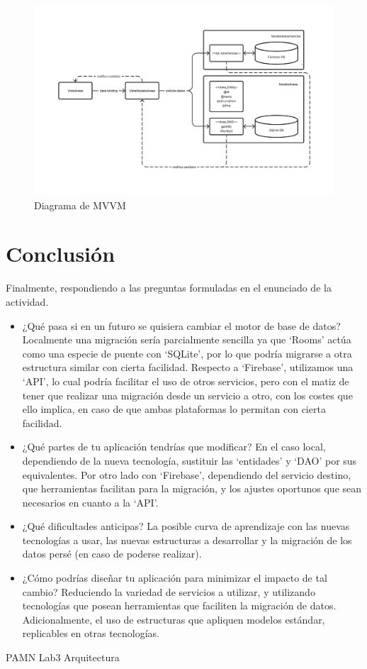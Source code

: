 \documentclass{article}
\begin{document}
    \begin{figure}[H]
        \centerline{\includegraphics[scale=0.3]{bbdddiagram}}
        \caption{Diagrama de MVVM}
        \label{fig:bbdddiagram}
    \end{figure}

    \section{Conclusión}
    Finalmente, respondiendo a las preguntas formuladas en el enunciado de la actividad.
    
    \begin{itemize}
        \item ¿Qué pasa si en un futuro se quisiera cambiar el motor de base de datos?
        Localmente una migración sería parcialmente sencilla ya que \enquote*{Rooms}
         actúa como una especie de puente con \enquote*{SQLite}, por lo que podría migrarse
         a otra estructura similar con cierta facilidad. Respecto a \enquote*{Firebase}, utilizamos
         una \enquote*{API}, lo cual podría facilitar el uso de otros servicios, pero con el matiz
         de tener que realizar una migración desde un servicio a otro, con los costes que ello
         implica, en caso de que ambas plataformas lo permitan con cierta facilidad.
        \item ¿Qué partes de tu aplicación tendrías que modificar?
        En el caso local, dependiendo de la nueva tecnología, sustituir las \enquote*{entidades} y
         \enquote*{DAO} por sus equivalentes. Por otro lado con \enquote*{Firebase}, dependiendo
         del servicio destino, que herramientas facilitan para la migración, y los ajustes
         oportunos que sean necesarios en cuanto a la \enquote*{API}.
        \item ¿Qué dificultades anticipas?
        La posible curva de aprendizaje con las nuevas tecnologías a usar, las nuevas estructuras a
         desarrollar y la migración de los datos persé (en caso de poderse realizar).
        \item ¿Cómo podrías diseñar tu aplicación para minimizar el impacto de tal cambio?
        Reduciendo la variedad de servicios a utilizar, y utilizando tecnologías que posean herramientas
         que faciliten la migración de datos. Adicionalmente, el uso de estructuras que apliquen modelos
         estándar, replicables en otras tecnologías.
    \end{itemize}

    \begin{thebibliography}{}
         PAMN Lab3 Arquitectura
    \end{thebibliography}
        
\end{document}
